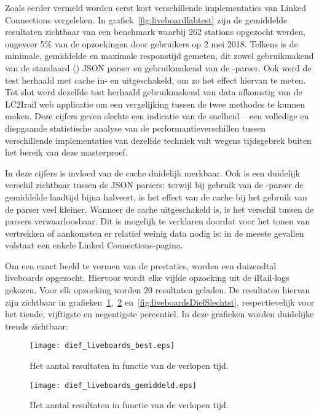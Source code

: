 Zoals eerder vermeld worden eerst kort verschillende implementaties van Linked Connections vergeleken. In grafiek~\ref{fig:liveboardlabtest} zijn de gemiddelde resultaten zichtbaar van een benchmark waarbij 262 stations opgezocht werden, ongeveer 5\% van de opzoekingen door gebruikers op 2 mei 2018. Telkens is de minimale, gemiddelde en maximale responstijd gemeten, dit zowel gebruikmakend van de standaard () JSON parser en gebruikmakend van de -parser. Ook werd de test herhaald met cache in- en uitgeschakeld, om zo het effect hiervan te meten. Tot slot werd dezelfde test herhaald gebruikmakend van data afkomstig van de LC2Irail web applicatie om een vergelijking tussen de twee methodes te kunnen maken. Deze cijfers geven slechts een indicatie van de snelheid -- een volledige en diepgaande statistische analyse van de performantieverschillen tussen verschillende implementaties van dezelfde techniek valt wegens tijdsgebrek buiten het bereik van deze masterproef.

In deze cijfers is invloed van de cache duidelijk merkbaar. Ook is een duidelijk verschil zichtbaar tussen de JSON parsers: terwijl bij gebruik van de -parser de gemiddelde laadtijd bijna halveert, is het effect van de cache bij het gebruik van de  parser veel kleiner. Wanneer de cache uitgeschakeld is, is het verschil tussen de parsers verwaarloosbaar. Dit is mogelijk te verklaren doordat voor het tonen van vertrekken of aankomsten er relatief weinig data nodig is: in de meeste gevallen volstaat een enkele Linked Connections-pagina.

Om een exact beeld te vormen van de prestaties, worden een duizendtal liveboards opgezocht. Hiervoor wordt elke vijfde opzoeking uit de iRail-logs gekozen. Voor elk opzoeking worden 20 resultaten geladen. De resultaten hiervan zijn zichtbaar in grafieken~\ref{fig:liveboardsDiefBest},~\ref{fig:liveboardsDiefAvg} en~\ref{fig:liveboardsDiefSlechtst}, respectievelijk voor het tiende, vijftigste en negentigste percentiel. In deze grafieken worden duidelijke trends zichtbaar:

\begin{figure}[h]
	\centering
	\texttt{[image: dief\_liveboards\_best.eps]}
	\caption[Aantal resultaten liveboards in functie van de tijd (10e percentiel)]{Het aantal resultaten in functie van de verlopen tijd.}
	\label{fig:liveboardsDiefBest}
\end{figure}

\begin{figure}[h]
	\centering
	\texttt{[image: dief\_liveboards\_gemiddeld.eps]}
	\caption[Aantal resultaten liveboards in functie van de tijd (mediaan)]{Het aantal resultaten in functie van de verlopen tijd.}
	\label{fig:liveboardsDiefAvg}
\end{figure}

